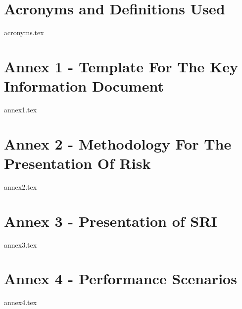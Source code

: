 \documentclass{report}
\begin{document}
	
\tableofcontents

\part{Acronyms and Definitions Used}
{acronyms.tex}
\pagebreak

\part{Annex 1 - 
\textbf{\color{blue}Template For The Key Information Document}
}

{annex1.tex}
\pagebreak

\part{Annex 2 - 
\textbf{\color{blue}Methodology For The Presentation Of Risk}
}

{annex2.tex}
\pagebreak

\part{Annex 3 -
	\textbf{\color{blue}Presentation of SRI}
}

{annex3.tex}
\pagebreak

\part{Annex 4 -
	\textbf{\color{blue}Performance Scenarios}
}

{annex4.tex}
\pagebreak
\end{document}
